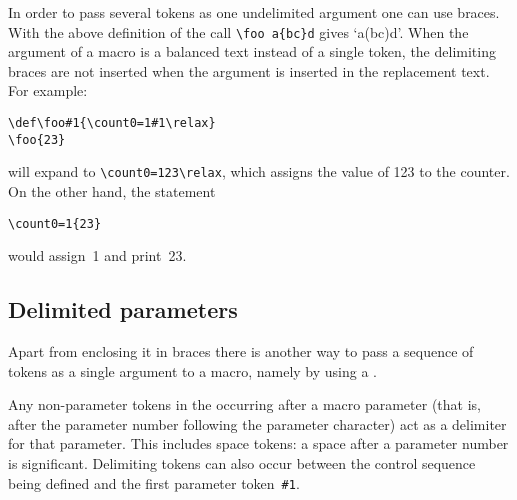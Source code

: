 \documentclass[letterpaper]{book}
\begin{document}
In order to pass several tokens as one undelimited argument
one can use braces. With the above definition of 
the call \verb>\foo a{bc}d> gives `\hbox{a(bc)d}'.
When the argument of a macro is a balanced text instead of
a single token, the delimiting braces are not inserted when 
the argument is
inserted in the replacement text.
For example:
\begin{verbatim}
\def\foo#1{\count0=1#1\relax}
\foo{23}
\end{verbatim}
will expand to \verb>\count0=123\relax>,
which assigns the value of 123 to the counter.
On the other hand,  the statement
\begin{verbatim}
\count0=1{23}
\end{verbatim}
would
assign~1 and print~23.

\subsection{Delimited parameters}

Apart from enclosing it in braces there is another way
to pass a sequence of tokens as a single argument to a macro,
namely by using a .

Any non-parameter tokens in the  occurring
after a macro parameter (that is, after the parameter number
following the parameter character)
act as a delimiter for that parameter. This includes space tokens:
a space after a parameter number is significant.
Delimiting tokens can also occur between the control
sequence being defined and the first parameter token~\verb>#1>.
\end{document}
